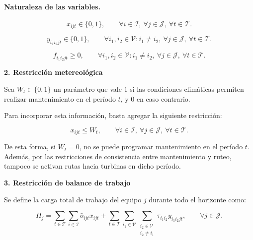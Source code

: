 \paragraph{Naturaleza de las variables.}

\begin{equation}
x_{ijt}\in\{0,1\},
\qquad \forall i\in\mathcal{I},\ \forall j\in\mathcal{J},\ \forall t\in\mathcal{T}.
\end{equation}

\begin{equation}
y_{i_1 i_2 jt}\in\{0,1\},
\qquad 
\forall i_1,i_2\in\mathcal{V}: i_1\neq i_2,\ 
\forall j\in\mathcal{J},\ \forall t\in\mathcal{T}.
\end{equation}

\begin{equation}
f_{i_1 i_2 jt}\geq 0,
\qquad 
\forall i_1,i_2\in\mathcal{V}: i_1\neq i_2,\ 
\forall j\in\mathcal{J},\ \forall t\in\mathcal{T}.
\end{equation}

\medskip
\noindent\textbf{2.\; Restricción metereológica}\par

Sea $W_t\in\{0,1\}$ un parámetro que vale $1$ si las condiciones climáticas permiten
realizar mantenimiento en el período $t$, y $0$ en caso contrario.

Para incorporar esta información, basta agregar la siguiente restricción:

\begin{equation}
x_{ijt}
\leq
W_t,
\qquad \forall i\in\mathcal{I},\ \forall j\in\mathcal{J},\ \forall t\in\mathcal{T}.
\end{equation}

De esta forma, si $W_t=0$, no se puede programar mantenimiento en el período $t$.
Además, por las restricciones de consistencia entre mantenimiento y ruteo, tampoco se
activan rutas hacia turbinas en dicho período.

\medskip
\noindent\textbf{3.\; Restricción de balance de trabajo}\par

Se define la carga total de trabajo del equipo $j$ durante todo el horizonte como:

\begin{equation}
H_j
=
\sum_{t\in\mathcal{T}}
\sum_{i\in\mathcal{I}}
\bar{o}_{ijt}x_{ijt}
+
\sum_{t\in\mathcal{T}}
\sum_{i_1\in\mathcal{V}}
\sum_{\substack{i_2\in\mathcal{V}\\ i_2\neq i_1}}
\tau_{i_1 i_2}y_{i_1 i_2 jt},
\qquad \forall j\in\mathcal{J}.
\end{equation}

